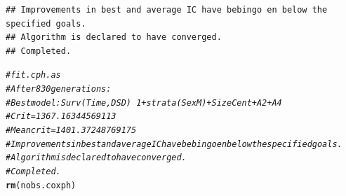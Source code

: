 \documentclass{article}\usepackage[]{graphicx}\usepackage[]{color}
\makeatletter
\newcommand{\hlcom}[1]{\textcolor[rgb]{0.678,0.584,0.686}{\textit{#1}}}%
\newcommand{\hlstd}[1]{\textcolor[rgb]{0.345,0.345,0.345}{#1}}%
\newcommand{\hlkwd}[1]{\textcolor[rgb]{0.737,0.353,0.396}{\textbf{#1}}}%
\newenvironment{kframe}{%
 \def\at@end@of@kframe{}%
 \ifinner\ifhmode%
  \def\at@end@of@kframe{\end{minipage}}%
  \begin{minipage}{\columnwidth}%
 \fi\fi%
 \def\FrameCommand##1{\hskip\@totalleftmargin \hskip-\fboxsep
 \colorbox{shadecolor}{##1}\hskip-\fboxsep
     \hskip-\linewidth \hskip-\@totalleftmargin \hskip\columnwidth}%
 \MakeFramed {\advance\hsize-\width
   \@totalleftmargin\z@ \linewidth\hsize
   \@setminipage}}%
 {\par\unskip\endMakeFramed%
 \at@end@of@kframe}
\newenvironment{knitrout}{}{} %
\makeatother
\begin{document}
\begin{knitrout}
\begin{kframe}
{\ttfamily\noindent\color{warningcolor}{\#\# Warning in fitter(X, Y, strats, offset, init, control, weights = weights, : Loglik converged before variable\ \ 13 ; beta may be infinite.}}\begin{verbatim}
## Improvements in best and average IC have bebingo en below the specified goals.
## Algorithm is declared to have converged.
## Completed.
\end{verbatim}
\begin{alltt}
\hlcom{# fit.cph.as}
\hlcom{# After 830 generations:}
\hlcom{# Best model: Surv(Time,DSD)~1+strata(SexM)+SizeCent+A2+A4}
\hlcom{# Crit= 1367.16344569113}
\hlcom{# Mean crit= 1401.37248769175}
\hlcom{# Improvements in best and average IC have bebingo en below the specified goals.}
\hlcom{# Algorithm is declared to have converged.}
\hlcom{# Completed.}
\hlkwd{rm}\hlstd{(nobs.coxph)}
\end{alltt}
\end{kframe}
\end{knitrout}
\end{document}
